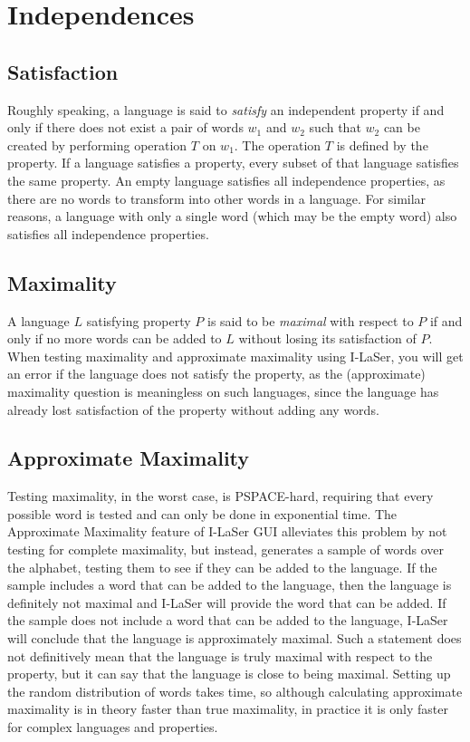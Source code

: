\documentclass{article}
\begin{document}
\section{Independences}

\subsection{Satisfaction}
\par Roughly speaking, a language is said to \textit{satisfy} an independent property if and only if there does not exist a pair of words $w_1$ and $w_2$ such that $w_2$ can be created by performing operation $T$ on $w_1$. The operation $T$ is defined by the property. If a language satisfies a property, every subset of that language satisfies the same property. An empty language satisfies all independence properties, as there are no words to transform into other words in a language. For similar reasons, a language with only a single word (which may be the empty word) also satisfies all independence properties. 

\subsection{Maximality}
\par A language $L$ satisfying property $P$ is said to be \textit{maximal} with respect to $P$ if and only if no more words can be added to $L$ without losing its satisfaction of $P$. When testing maximality and approximate maximality using I-LaSer, you will get an error if the language does not satisfy the property, as the (approximate) maximality question is meaningless on such languages, since the language has already lost satisfaction of the property without adding any words. 

\subsection{Approximate Maximality}
\par Testing maximality, in the worst case, is PSPACE-hard, requiring that every possible word is tested and can only be done in exponential time. The Approximate Maximality feature of I-LaSer GUI alleviates this problem by not testing for complete maximality, but instead, generates a sample of words over the alphabet, testing them to see if they can be added to the language. If the sample includes a word that can be added to the language, then the language is definitely not maximal and I-LaSer will provide the word that can be added. If the sample does not include a word that can be added to the language, I-LaSer will conclude that the language is approximately maximal. Such a statement does not definitively mean that the language is truly maximal with respect to the property, but it can say that the language is close to being maximal. Setting up the random distribution of words takes time, so although calculating approximate maximality is in theory faster than true maximality, in practice it is only faster for complex languages and properties. 
\end{document}
